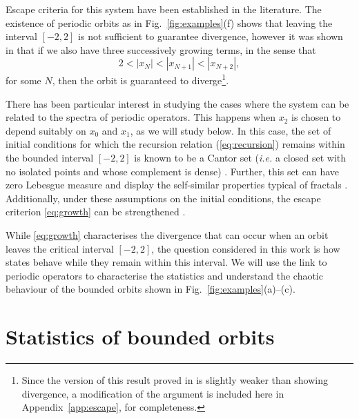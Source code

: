\documentclass[nofootinbib,prb,amsmath,amssymb,twocolumn,floatfix]{revtex4-2}
\theoremstyle{definition}
\begin{document}

Escape criteria for this system have been established in the literature. The existence of periodic orbits as in Fig.~\ref{fig:examples}(f) shows that leaving the interval $[-2,2]$ is not sufficient to guarantee divergence, however it was shown in \cite[Theorem~3.1]{davies2023super} that if we also have three successively growing terms, in the sense that
\begin{equation} \label{eq:growth}
	2<|x_N|<|x_{N+1}|<|x_{N+2}|,
\end{equation}
for some $N$, then the orbit is guaranteed to diverge\footnote{Since the version of this result proved in \cite[Theorem 3.1]{davies2023super} is slightly weaker than showing divergence, a modification of the argument is included here in Appendix~\ref{app:escape},  for completeness.}.

There has been particular interest in studying the cases where the system can be related to the spectra of periodic operators. This happens when $x_2$ is chosen to depend suitably on $x_0$ and $x_1$, as we will study below. In this case, the set of initial conditions for which the recursion relation (\ref{eq:recursion}) remains within the bounded interval $[-2,2]$ is known to be a Cantor set (\emph{i.e.} a closed set with no isolated points and whose complement is dense) \cite{kohmoto1984cantor, sutHo1989singular}. Further, this set can have zero Lebesgue measure \cite{sutHo1989singular} and display the self-similar properties typical of fractals \cite{kohmoto1983localization, morini2018waves}. Additionally, under these assumptions on the initial conditions, the escape criterion \eqref{eq:growth} can be strengthened \cite[Corollary 3.10]{davies2025convergence}.


While \eqref{eq:growth} characterises the divergence that can occur when an orbit leaves the critical interval $[-2,2]$, the question considered in this work is how states behave while they remain within this interval. We will use the link to periodic operators to characterise the statistics and understand the chaotic behaviour of the bounded orbits shown in Fig.~\ref{fig:examples}(a)--(c).



\section{Statistics of bounded orbits} \label{sec:bounded}
\end{document}
